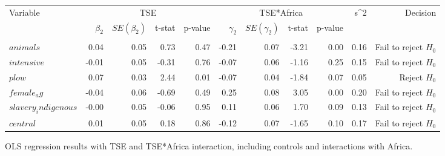 \centering
\begin{tabular}{lrrrrrrrrrr}
\hline
Variable & \multicolumn{4}{c}{TSE} & \multicolumn{4}{c}{TSE*Africa} & s^2 & Decision \\
\cmidrule(lr){2-5} \cmidrule(lr){6-9}
 & $\beta_2$ & $SE(\beta_2)$ & t-stat & p-value & $\gamma_2$ & $SE(\gamma_2)$ & t-stat & p-value & & \\\\
\hline
$animals$ & 0.04 & 0.05 & 0.73 & 0.47 & -0.21 & 0.07 & -3.21 & 0.00 & 0.16 & Fail to reject $H_0$ \\
$intensive$ & -0.01 & 0.05 & -0.31 & 0.76 & -0.07 & 0.06 & -1.16 & 0.25 & 0.15 & Fail to reject $H_0$ \\
$plow$ & 0.07 & 0.03 & 2.44 & 0.01 & -0.07 & 0.04 & -1.84 & 0.07 & 0.05 & Reject $H_0$ \\
$female_ag$ & -0.04 & 0.06 & -0.69 & 0.49 & 0.25 & 0.08 & 3.05 & 0.00 & 0.20 & Fail to reject $H_0$ \\
$slavery_indigenous$ & -0.00 & 0.05 & -0.06 & 0.95 & 0.11 & 0.06 & 1.70 & 0.09 & 0.13 & Fail to reject $H_0$ \\
$central$ & 0.01 & 0.05 & 0.18 & 0.86 & -0.12 & 0.07 & -1.65 & 0.10 & 0.17 & Fail to reject $H_0$ \\
\hline
\end{tabular}
\caption{OLS regression results with TSE and TSE*Africa interaction, including controls and interactions with Africa.}
\label{tab:regression_results_africa}
